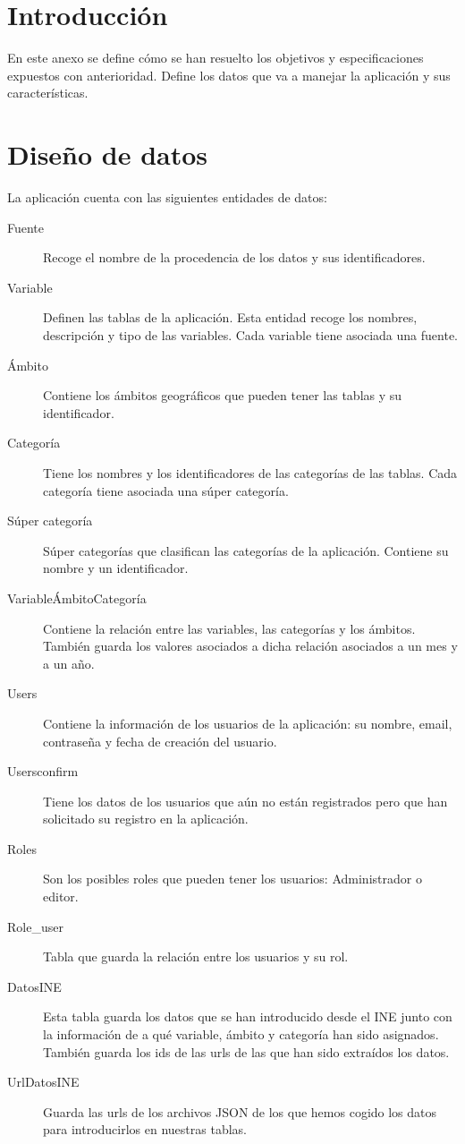 
\section{Introducción}
En este anexo se define cómo se han resuelto los objetivos y especificaciones expuestos con anterioridad. Define los datos que va a manejar la aplicación y sus características.
\section{Diseño de datos}
La aplicación cuenta con las siguientes entidades de datos:
\begin{description}
    \item [Fuente] Recoge el nombre de la procedencia de los datos y sus identificadores.
    \item [Variable] Definen las tablas de la aplicación. Esta entidad recoge los nombres, descripción y tipo de las variables. Cada variable tiene asociada una fuente.
    \item [Ámbito] Contiene los ámbitos geográficos que pueden tener las tablas y su identificador.
    \item [Categoría] Tiene los nombres y los identificadores de las categorías de las tablas. Cada categoría tiene asociada una súper categoría.
    \item [Súper categoría] Súper categorías que clasifican las categorías de la aplicación. Contiene su nombre y un identificador.
    \item [VariableÁmbitoCategoría] Contiene la relación entre las variables, las categorías y los ámbitos. También guarda los valores asociados a dicha relación asociados a un mes y a un año.
    \item [Users] Contiene la información de los usuarios de la aplicación: su nombre, email, contraseña y fecha de creación del usuario.
    \item [Usersconfirm] Tiene los datos de los usuarios que aún no están registrados pero que han solicitado su registro en la aplicación.
    \item [Roles] Son los posibles roles que pueden tener los usuarios: Administrador o editor.
    \item [Role\_user] Tabla que guarda la relación entre los usuarios y su rol.
    \item [DatosINE] Esta tabla guarda los datos que se han introducido desde el INE junto con la información de a qué variable, ámbito y categoría han sido asignados. También guarda los ids de las urls de las que han sido extraídos los datos. 
    \item [UrlDatosINE] Guarda las urls de los archivos JSON de los que hemos cogido los datos para introducirlos en nuestras tablas.
\end{description}
